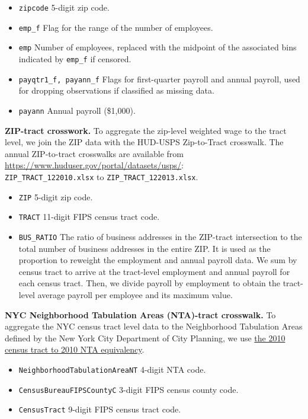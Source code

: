 \documentclass[11pt]{article}
\theoremstyle{definition}
\begin{document}
\begin{itemize}
\item \texttt{zipcode} 5-digit zip code.
\item \texttt{emp\_f} Flag for the range of the number of employees.
\item \texttt{emp} Number of employees, replaced with the midpoint of the associated bins 
indicated by \texttt{emp\_f} if censored.
\item \texttt{payqtr1\_f, payann\_f} Flags for first-quarter payroll and annual payroll, 
used for dropping observations if classified as missing data.
\item \texttt{payann} Annual payroll (\$1,000).
\end{itemize}

\noindent \textbf{ZIP-tract crosswork.} To aggregate the zip-level weighted wage to the tract level, 
we join the ZIP data with the HUD-USPS Zip-to-Tract crosswalk. 
The annual ZIP-to-tract crosswalks are available from \url{https://www.huduser.gov/portal/datasets/usps/}:
\\\texttt{ZIP\_TRACT\_122010.xlsx} to \texttt{ZIP\_TRACT\_122013.xlsx}.

\begin{itemize}
\item \texttt{ZIP} 5-digit zip code.
\item \texttt{TRACT} 11-digit FIPS census tract code.
\item \texttt{BUS\_RATIO} The ratio of business addresses in the ZIP-tract intersection to 
the total number of business addresses in the entire ZIP. 
It is used as the proportion to reweight the employment and annual payroll data. 
We sum by census tract to arrive at the tract-level employment and annual payroll 
for each census tract. Then, we divide payroll by employment to obtain the tract-level 
average payroll per employee and its maximum value.
\end{itemize}

\noindent \textbf{NYC Neighborhood Tabulation Areas (NTA)-tract crosswalk.} 
To aggregate the NYC census tract level data to the Neighborhood Tabulation Areas 
defined by the New York City Department of City Planning, 
we use \href{https://www1.nyc.gov/assets/planning/download/office/data-maps/nyc-population/census2010/nyc2010census\_tabulation\_equiv.xlsx}{the 2010 census tract to 2010 NTA equivalency}.

\begin{itemize}
\item \texttt{NeighborhoodTabulationAreaNT} 4-digit NTA code.
\item \texttt{CensusBureauFIPSCountyC} 3-digit FIPS census county code.
\item \texttt{CensusTract} 9-digit FIPS census tract code.
\end{itemize}
\end{document}
